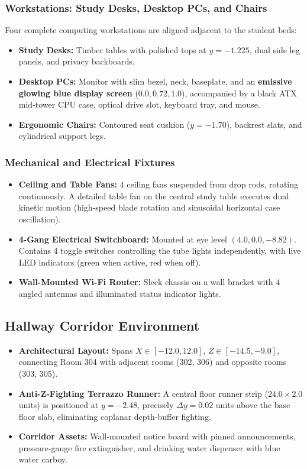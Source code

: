 \documentclass[11pt,a4paper]{article}
\begin{document}
\subsubsection{Workstations: Study Desks, Desktop PCs, and Chairs}
Four complete computing workstations are aligned adjacent to the student beds:
\begin{itemize}[leftmargin=1.2em, itemsep=0.5pt, topsep=0.5pt]
    \item \textbf{Study Desks:} Timber tables with polished tops at $y = -1.225$, dual side leg panels, and privacy backboards.
    \item \textbf{Desktop PCs:} Monitor with slim bezel, neck, baseplate, and an \textbf{emissive glowing blue display screen} ($0.0, 0.72, 1.0$), accompanied by a black ATX mid-tower CPU case, optical drive slot, keyboard tray, and mouse.
    \item \textbf{Ergonomic Chairs:} Contoured seat cushion ($y = -1.70$), backrest slats, and cylindrical support legs.
\end{itemize}

\subsubsection{Mechanical and Electrical Fixtures}
\begin{itemize}[leftmargin=1.2em, itemsep=0.5pt, topsep=0.5pt]
    \item \textbf{Ceiling and Table Fans:} 4 ceiling fans suspended from drop rods, rotating continuously. A detailed table fan on the central study table executes dual kinetic motion (high-speed blade rotation and sinusoidal horizontal case oscillation).
    \item \textbf{4-Gang Electrical Switchboard:} Mounted at eye level $(4.0, 0.0, -8.82)$. Contains 4 toggle switches controlling the tube lights independently, with live LED indicators (green when active, red when off).
    \item \textbf{Wall-Mounted Wi-Fi Router:} Sleek chassis on a wall bracket with 4 angled antennas and illuminated status indicator lights.
\end{itemize}

\subsection{Hallway Corridor Environment}
\begin{itemize}[leftmargin=1.2em, itemsep=0.5pt, topsep=0.5pt]
    \item \textbf{Architectural Layout:} Spans $X \in [-12.0, 12.0]$, $Z \in [-14.5, -9.0]$, connecting Room 304 with adjacent rooms (302, 306) and opposite rooms (303, 305).
    \item \textbf{Anti-Z-Fighting Terrazzo Runner:} A central floor runner strip ($24.0 \times 2.0$ units) is positioned at $y = -2.48$, precisely $\Delta y = 0.02$ units above the base floor slab, eliminating coplanar depth-buffer fighting.
    \item \textbf{Corridor Assets:} Wall-mounted notice board with pinned announcements, pressure-gauge fire extinguisher, and drinking water dispenser with blue water carboy.
\end{itemize}
\end{document}
